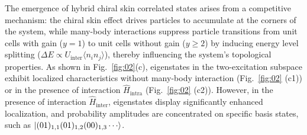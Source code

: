 \documentclass[longbibliography, aps, prx, amsmath, amssymb, amsfonts, twocolumn,superscriptaddress, footinbib]{revtex4-1}
\begin{document}
	The emergence of hybrid chiral skin correlated states arises from a competitive mechanism: the chiral skin effect drives particles to accumulate at the corners of the system, while many-body interactions suppress particle transitions from unit cells with gain ($y=1$) to unit cells without gain ($y \geq 2$) by inducing energy level splitting ($\Delta E \propto U_{\text{inter}}\langle n_i n_j \rangle$), thereby influencing the system's topological properties.
	As shown in Fig.~\ref{fig:02}(c), eigenstates in the two-excitation subspace exhibit localized characteristics 
	without many-body interaction (Fig.~\ref{fig:02} (c1)) or in the presence of interaction $\hat{H}_{\text{intra}}$ (Fig.~\ref{fig:02} (c2)). However, in the presence of interaction $\hat{H}_{\text{inter}}$, eigenstates display significantly enhanced localization, and probability amplitudes are concentrated on specific basis states, such as $\ket{(01)_{1,1}(01)_{1,2}(00)_{1,3}\cdots}$. 
\end{document}
